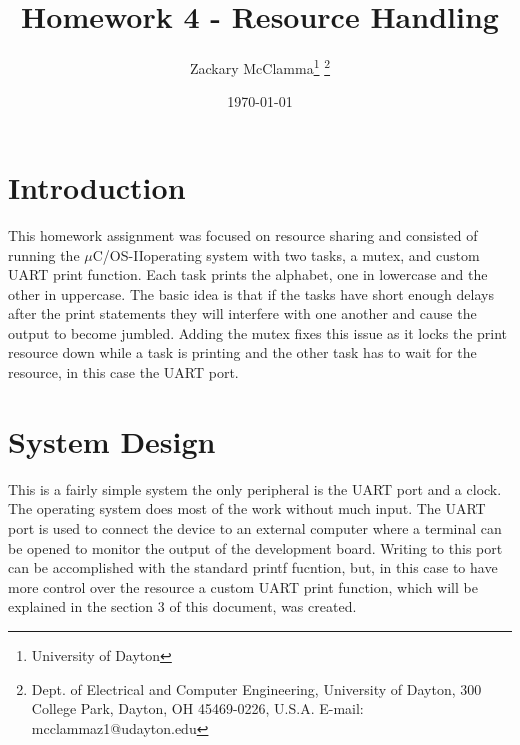 \documentclass[10pt,a4paper]{article}
\begin{document}
	\title{Homework 4 - Resource Handling}
	\makeatletter
	
	\author{Zackary McClamma\thanks{University of Dayton}
		\thanks{Dept. of Electrical and Computer
			Engineering, University of Dayton, 300 College Park, Dayton, OH
			45469-0226, U.S.A. E-mail:
			mcclammaz1@udayton.edu}}
	
	\makeatother
	
	\date{\today}
	
	\maketitle
	\section{Introduction}
	This homework assignment was focused on resource sharing and consisted of running the $\mu$C/OS-II\texttrademark operating system with two tasks, a mutex, and custom UART print function. Each task prints the alphabet, one in lowercase and the other in uppercase. The basic idea is that if the tasks have short enough delays after the print statements they will interfere with one another and cause the output to become jumbled. Adding the mutex fixes this issue as it locks the print resource down while a task is printing and the other task has to wait for the resource, in this case the UART port.
	
	\section{System Design}
 	This is a fairly simple system the only peripheral is the UART port and a clock. The operating system does most of the work without much input. The UART port is used to connect the device to an external computer where a terminal can be opened to monitor the output of the development board. Writing to this port can be accomplished with the standard printf fucntion, but, in this case to have more control over the resource a custom UART print function, which will be explained in the section 3 of this document, was created.

	
\end{document}
